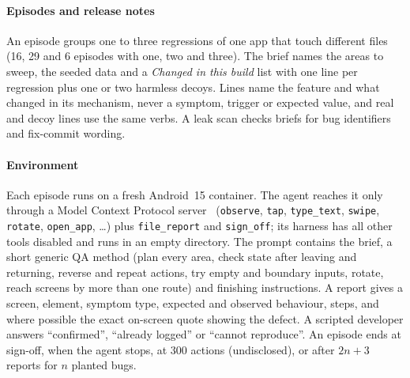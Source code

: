 \documentclass[10pt,letterpaper]{article}
\begin{document}
\paragraph{Episodes and release notes}
An episode groups one to three regressions of one app that touch different files (16, 29 and 6
episodes with one, two and three). The brief names the areas to sweep, the seeded data and a
\emph{Changed in this build} list with one line per regression plus one or two harmless decoys. Lines
name the feature and what changed in its mechanism, never a symptom, trigger or expected value, and
real and decoy lines use the same verbs. A leak scan checks briefs for bug identifiers and
fix-commit wording.

\paragraph{Environment}
Each episode runs on a fresh Android~15 container. The agent reaches it only through a Model Context
Protocol server~\cite{anthropic2024mcp} (\texttt{observe}, \texttt{tap}, \texttt{type\_text},
\texttt{swipe}, \texttt{rotate}, \texttt{open\_app}, \ldots) plus \texttt{file\_report} and
\texttt{sign\_off}; its harness has all other tools disabled and runs in an empty directory. The
prompt contains the brief, a short generic QA method (plan every area, check state after leaving and
returning, reverse and repeat actions, try empty and boundary inputs, rotate, reach screens by more
than one route) and finishing instructions. A report gives a screen, element, symptom type, expected
and observed behaviour, steps, and where possible the exact on-screen quote showing the defect. A
scripted developer answers ``confirmed'', ``already logged'' or ``cannot reproduce''. An episode ends
at sign-off, when the agent stops, at 300 actions (undisclosed), or after $2n{+}3$ reports for $n$
planted bugs.
\end{document}
